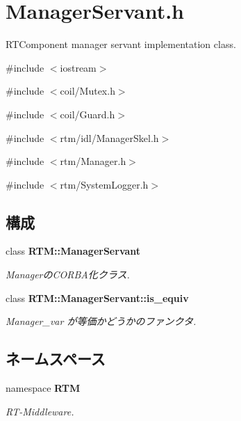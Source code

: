 \section{ManagerServant.h}
\label{ManagerServant_8h}


RTComponent manager servant implementation class.  


{\ttfamily \#include $<$iostream$>$}\par
{\ttfamily \#include $<$coil/Mutex.h$>$}\par
{\ttfamily \#include $<$coil/Guard.h$>$}\par
{\ttfamily \#include $<$rtm/idl/ManagerSkel.h$>$}\par
{\ttfamily \#include $<$rtm/Manager.h$>$}\par
{\ttfamily \#include $<$rtm/SystemLogger.h$>$}\par
\subsection*{構成}
\begin{DoxyCompactItemize}
\item 
class {\bf RTM::ManagerServant}
\begin{DoxyCompactList}\small\item\em ManagerのCORBA化クラス. \item\end{DoxyCompactList}\item 
class {\bfseries RTM::ManagerServant::is\_\-equiv}
\begin{DoxyCompactList}\small\item\em Manager\_\-var が等価かどうかのファンクタ. \item\end{DoxyCompactList}\end{DoxyCompactItemize}
\subsection*{ネームスペース}
\begin{DoxyCompactItemize}
\item 
namespace {\bf RTM}


\begin{DoxyCompactList}\small\item\em RT-\/Middleware. \item\end{DoxyCompactList}

\end{DoxyCompactItemize}


